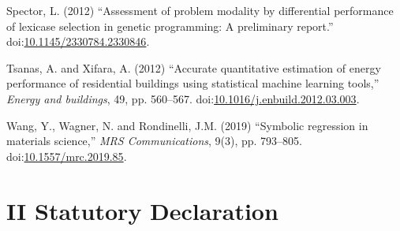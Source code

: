 \documentclass[
  12pt,
]{article}
\newlength{\cslhangindent}
\newlength{\cslentryspacingunit} %
\newenvironment{CSLReferences}[2] %
 {%
  \setlength{\parindent}{0pt}
  \ifodd #1
  \let\oldpar\par
  \def\par{\hangindent=\cslhangindent\oldpar}
  \fi
  \setlength{\parskip}{#2\cslentryspacingunit}
 }%
 {}
\begin{document}
\begin{CSLReferences}{0}{0}
\leavevmode{}%
Spector, L. (2012) {``Assessment of problem modality by differential
performance of lexicase selection in genetic programming: A preliminary
report.''}
doi:\href{https://doi.org/10.1145/2330784.2330846}{10.1145/2330784.2330846}.

\leavevmode{}%
Tsanas, A. and Xifara, A. (2012) {``Accurate quantitative estimation of
energy performance of residential buildings using statistical machine
learning tools,''} \emph{Energy and buildings}, 49, pp. 560--567.
doi:\href{https://doi.org/10.1016/j.enbuild.2012.03.003}{10.1016/j.enbuild.2012.03.003}.

\leavevmode{}%
Wang, Y., Wagner, N. and Rondinelli, J.M. (2019) {``Symbolic regression
in materials science,''} \emph{MRS Communications}, 9(3), pp. 793--805.
doi:\href{https://doi.org/10.1557/mrc.2019.85}{10.1557/mrc.2019.85}.

\end{CSLReferences}

\newpage

\hypertarget{II}{%
\section*{II Statutory Declaration}\label{II}}
\end{document}
